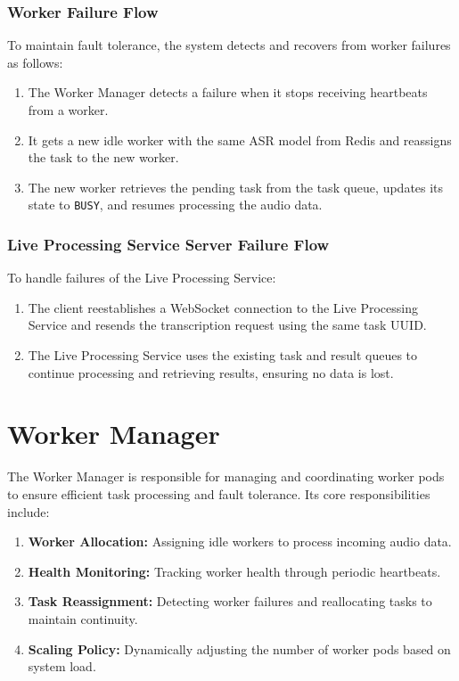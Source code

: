 \subsubsection{Worker Failure Flow}
To maintain fault tolerance, the system detects and recovers from worker failures as follows:
\begin{enumerate}
    \item The Worker Manager detects a failure when it stops receiving heartbeats from a worker.
    \item It gets a new idle worker with the same ASR model from Redis and reassigns the task to the new worker.
    \item The new worker retrieves the pending task from the task queue, updates its state to \texttt{BUSY}, and resumes processing the audio data.
\end{enumerate}

\subsubsection{Live Processing Service Server Failure Flow}
To handle failures of the Live Processing Service:
\begin{enumerate}
    \item The client reestablishes a WebSocket connection to the Live Processing Service and resends the transcription request using the same task UUID.
    \item The Live Processing Service uses the existing task and result queues to continue processing and retrieving results, ensuring no data is lost.
\end{enumerate}

\section{Worker Manager} \label{section:worker_manager}
The Worker Manager is responsible for managing and coordinating worker pods to ensure efficient task processing and fault tolerance. Its core responsibilities include:
\begin{enumerate}
  \item \textbf{Worker Allocation:} Assigning idle workers to process incoming audio data.
  \item \textbf{Health Monitoring:} Tracking worker health through periodic heartbeats.
  \item \textbf{Task Reassignment:} Detecting worker failures and reallocating tasks to maintain continuity.
  \item \textbf{Scaling Policy:} Dynamically adjusting the number of worker pods based on system load.
\end{enumerate}


